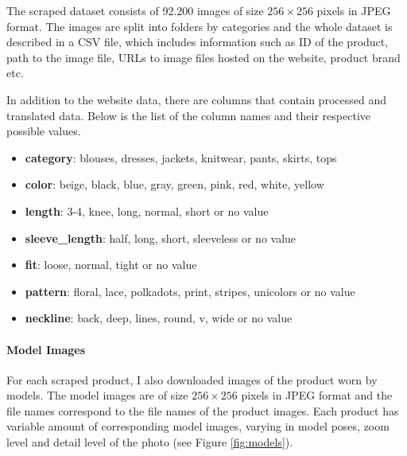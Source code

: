 \documentclass[12pt]{report}
\begin{document}
The scraped dataset consists of 92.200 images of size $256\times256$ pixels in JPEG format. The images are split into folders by categories and the whole dataset is described in a CSV file, which includes information such as ID of the product,  path to the image file, URLs to image files hosted on the website, product brand etc.

In addition to the website data, there are columns that contain processed and translated data. Below is the list of the column names and their respective possible values.
\begin{itemize}
\item \textbf{category}: blouses, dresses, jackets, knitwear, pants, skirts, tops
\item \textbf{color}: beige, black, blue, gray, green, pink, red, white, yellow
\item \textbf{length}: 3-4, knee, long, normal, short or no value
\item \textbf{sleeve\_length}: half, long, short, sleeveless or no value
\item \textbf{fit}: loose, normal, tight or no value
\item \textbf{pattern}: floral, lace, polkadots, print, stripes, unicolors or no value
\item \textbf{neckline}: back, deep, lines, round, v, wide or no value
\end{itemize}

\paragraph{Model Images}
For each scraped product, I also downloaded images of the product worn by models. The model images are of size $256\times256$ pixels in JPEG format and the file names correspond to the file names of the product images. Each product has variable amount of corresponding model images, varying in model poses, zoom level and detail level of the photo (see Figure \ref{fig:models}).
\end{document}
